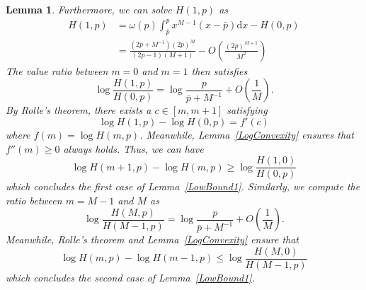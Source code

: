 \documentclass{article}
\makeatletter
\newcounter{lemmas}
\newtheorem{lemma}[lemmas]{Lemma}
\renewenvironment{proof}[1][\proofname]{\par
  \vspace{-\topsep}%
  \pushQED{\qed}%
  \normalfont
  \topsep0pt \partopsep0pt %
  \trivlist
  \item[\hskip\labelsep
        \itshape
    #1\@addpunct{.}]\ignorespaces
}{%
  \popQED\endtrivlist\@endpefalse
  \addvspace{0pt plus 0pt} %
}
\makeatother
\begin{document}
\begin{lemma}
\begin{proof}
Furthermore, we can solve $H(1,p)$ as
\begin{equation}
\begin{split}
H(1,p)&= \omega(p)\int_{\bar{p}}^{p}x^{M-1}(x-\bar{p})\mathrm{d}x-H(0,p)\\
&=\frac{(2\bar{p}+M^{-1})(2p)^{M}}{(2p-1)(M+1)} - O\left(\frac{(2p)^{M+1}}{M^2}\right)
\end{split}
\end{equation}
The value ratio between $m=0$ and $m=1$ then satisfies
\begin{equation}
\log \frac{H(1,p)}{H(0,p)}  = \log\frac{p}{\bar{p}+M^{-1}}+O\left(\frac{1}{M}\right).
\end{equation}
By Rolle's theorem, there exists a $c\in [m, m+1]$ satisfying
\begin{equation}
\log H(1,p) - \log H(0,p) = f'(c)
\end{equation}
where $f(m)=\log H(m,p)$. Meanwhile, Lemma~\ref{LogConvexity} ensures that $f''(m)\geq 0$ always holds. Thus, we can have
\begin{equation}
\log H(m+1,p) - \log H(m,p)\geq \log \frac{H(1,0)}{H(0,p)}
\end{equation}
which concludes the first case of Lemma~\ref{LowBound1}. Similarly, we compute the ratio between $m=M-1$ and $M$ as
\begin{equation}
\log \frac{H(M,p)}{H(M-1,p)}  = \log\frac{p}{\bar{p}+M^{-1}}+O\left(\frac{1}{M}\right).
\end{equation}
Meanwhile, Rolle's theorem and Lemma~\ref{LogConvexity} ensure that
\begin{equation}
\log H(m,p) - \log H(m-1,p)\leq \log \frac{H(M,0)}{H(M-1,p)}
\end{equation}
which concludes the second case of Lemma~\ref{LowBound1}.


\end{proof}
\end{lemma}
\end{document}
